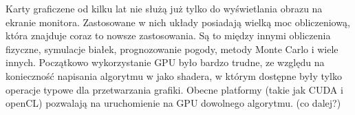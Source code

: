 

Karty graficzene od kilku lat nie służą już tylko do wyświetlania obrazu na ekranie monitora. Zastosowane w nich układy posiadają wielką moc obliczeniową, która znajduje coraz to nowsze zastosowania. Są to między innymi obliczenia fizyczne, symulacje białek, prognozowanie pogody, metody Monte Carlo i wiele innych. Początkowo wykorzystanie GPU było bardzo trudne, ze względu na konieczność napisania algorytmu w jako shadera, w którym dostępne były tylko operacje typowe dla przetwarzania grafiki. Obecne platformy (takie jak CUDA i openCL) pozwalają na uruchomienie na GPU dowolnego algorytmu. 
\linebreak
(co dalej?)
